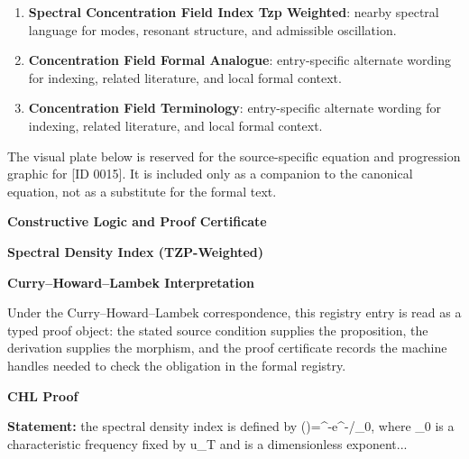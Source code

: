 \begingroup\footnotesize\sloppy
\begin{enumerate}[leftmargin=1.35em,itemsep=1pt,topsep=1pt,parsep=0pt]
\item \textbf{Spectral Concentration Field Index Tzp Weighted}: nearby spectral language for modes, resonant structure, and admissible oscillation.
\item \textbf{Concentration Field Formal Analogue}: entry-specific alternate wording for indexing, related literature, and local formal context.
\item \textbf{Concentration Field Terminology}: entry-specific alternate wording for indexing, related literature, and local formal context.
\end{enumerate}
\endgroup

\begingroup\footnotesize\sloppy
The visual plate below is reserved for the source-specific equation and progression graphic for [ID 0015]. It is included only as a companion to the canonical equation, not as a substitute for the formal text.
\par\endgroup
\ifTZPDarkEdition
{}
\fi

\clearpage
\begingroup\tzpsupportsetup
\noindent\textbf{\fontsize{10.8pt}{12.8pt}\selectfont [ID 0015] Constructive Logic and Proof Certificate}\par
\noindent\textbf{\fontsize{10pt}{12pt}\selectfont Spectral Density Index (TZP-Weighted)}\par
\vspace{0.45em}
\begingroup
\footnotesize
\setlength{\parskip}{0.22em}
\setlength{\parindent}{0pt}
\noindent\textbf{Curry--Howard--Lambek Interpretation}\par
Under the Curry--Howard--Lambek correspondence, this registry entry is read as a typed proof
object: the stated source condition supplies the proposition, the derivation supplies the
morphism, and the proof certificate records the machine handles needed to check the obligation
in the formal registry.

\vspace{0.45em}
\noindent\textbf{CHL Proof}\par
\textbf{Statement:} the spectral density index is defined by ()=\textasciicircum{}-e\textasciicircum{}-/\_0, where \_0 is a characteristic
frequency fixed by u\_T and  is a dimensionless exponent...

